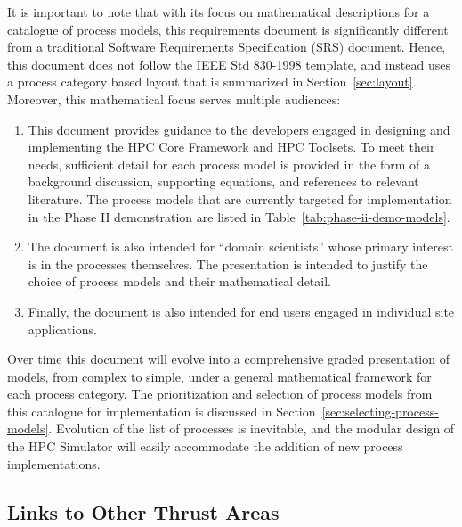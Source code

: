 It is important to note that with its focus on mathematical
descriptions for a catalogue of process models, this requirements
document is significantly different from a traditional Software
Requirements Specification (SRS) document.  Hence, this document does
not follow the IEEE Std 830-1998 template, and instead uses a process
category based layout that is summarized in Section~\ref{sec:layout}.
Moreover, this mathematical focus serves multiple audiences:
%
\begin{enumerate}
\item This document provides guidance to the developers engaged in
  designing and implementing the HPC Core Framework and HPC Toolsets.
  To meet their needs, sufficient detail for each process model is
  provided in the form of a background discussion, supporting equations, 
  and references to relevant literature.  The process models that are
  currently targeted for implementation in the Phase II demonstration 
  are listed in
  Table~\ref{tab:phase-ii-demo-models}.
\item The document is also intended for ``domain scientists'' whose
  primary interest is in the processes themselves.  The presentation
  is intended to justify the choice of process models and their
  mathematical detail.
\item Finally, the document is also intended for end users engaged in
  individual site applications.
\end{enumerate}
%
Over time this document will evolve into a comprehensive graded
presentation of models, from complex to simple, under a general
mathematical framework for each process category.  The prioritization
and selection of process models from this catalogue for implementation
is discussed in Section~\ref{sec:selecting-process-models}.
%
Evolution of the list of processes is inevitable, and the modular
design of the HPC Simulator will easily accommodate the addition of
new process implementations. 


\subsection{Links to Other Thrust Areas}
\label{sec:other-thrusts}

